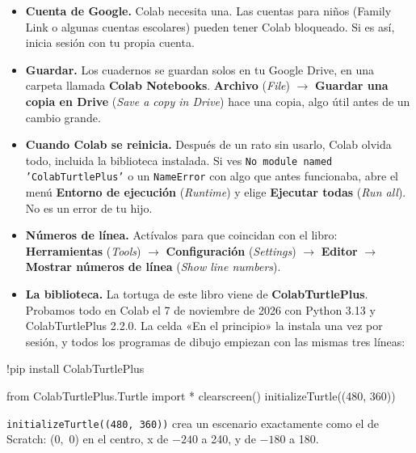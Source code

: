 \begin{itemize}
  \item \textbf{Cuenta de Google.} Colab necesita una. Las cuentas para niños (Family Link o algunas cuentas escolares) pueden tener Colab bloqueado. Si es así, inicia sesión con tu propia cuenta.
  \item \textbf{Guardar.} Los cuadernos se guardan solos en tu Google Drive, en una carpeta llamada \textbf{Colab Notebooks}. \textbf{Archivo} (\textit{File}) $\rightarrow$ \textbf{Guardar una copia en Drive} (\textit{Save a copy in Drive}) hace una copia, algo útil antes de un cambio grande.
  \item \textbf{Cuando Colab se reinicia.} Después de un rato sin usarlo, Colab olvida todo, incluida la biblioteca instalada. Si ves \texttt{No module named 'ColabTurtlePlus'} o un \texttt{NameError} con algo que antes funcionaba, abre el menú \textbf{Entorno de ejecución} (\textit{Runtime}) y elige \textbf{Ejecutar todas} (\textit{Run all}). No es un error de tu hijo.
  \item \textbf{Números de línea.} Actívalos para que coincidan con el libro: \textbf{Herramientas} (\textit{Tools}) $\rightarrow$ \textbf{Configuración} (\textit{Settings}) $\rightarrow$ \textbf{Editor} $\rightarrow$ \textbf{Mostrar números de línea} (\textit{Show line numbers}).
  \item \textbf{La biblioteca.} La tortuga de este libro viene de \textbf{ColabTurtlePlus}. Probamos todo en Colab el 7 de noviembre de 2026 con Python 3.13 y ColabTurtlePlus 2.2.0. La celda «En el principio» la instala una vez por sesión, y todos los programas de dibujo empiezan con las mismas tres líneas:
\end{itemize}

\begin{code}
!pip install ColabTurtlePlus
\end{code}
\begin{code}
from ColabTurtlePlus.Turtle import *
clearscreen()
initializeTurtle((480, 360))
\end{code}

\texttt{initializeTurtle((480, 360))} crea un escenario exactamente como el de Scratch: (0,~0) en el centro, x de $-240$ a 240, y de $-180$ a 180.

